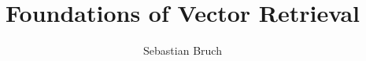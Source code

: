 \documentclass[graybox,envcountchap,sectrefs]{svmono}
\title{Foundations of Vector Retrieval}
\begin{document}
\author{Sebastian Bruch}
\maketitle

\frontmatter



\tableofcontents

\mainmatter















\printindex
\end{document}

